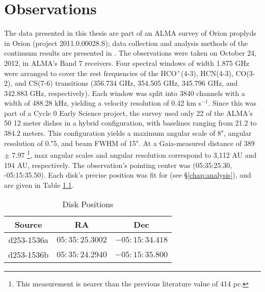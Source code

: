 \chapter{Observations}
\label{chap:observations}

 


The data presented in this thesis are part of an ALMA survey of Orion proplyds in Orion (project 2011.0.00028.S); data collection and analysis methods of the continuum results are presented in \citet{Mann2014}. The observations were taken on October 24, 2012, in ALMA's Band 7 receivers. Four spectral windows of width 1.875 GHz were arranged to cover the rest frequencies of the HCO$^+$(4-3), HCN(4-3), CO(3-2), and CS(7-6) transitions (356.734 GHz, 354.505 GHz, 345.796 GHz, and 342.883 GHz, respectively). Each window was split into 3840 channels with a width of 488.28 kHz, yielding a velocity resolution of 0.42 km s$^{-1}$. Since this was part of a Cycle 0 Early Science project, the survey used only 22 of the ALMA's 50 12 meter dishes in a hybrid configuration, with baselines ranging from 21.2 to 384.2 meters. This configuration yields a maximum angular scale of 8", angular resolution of 0."5, and beam FWHM of 15". At a Gaia-measured distance of 389 $\pm$ 7.97 \citep{GaiaCollaboration2018,GaiaCollaboration2018}\footnote{This measurement is nearer than the previous literature value of 414 pc.}, max angular scales and angular resolution correspond to 3,112 AU and 194 AU, respectively. The observation's pointing center was (05:35:25.30, -05:15:35.50). Each disk's precise position was fit for (see \S\ref{chap:analysis}), and are given in Table \ref{table:disk_positions}.


\begin{table}
  \centering
  \caption{Disk Positions}
  \label{table:disk_positions}
  \renewcommand{\arraystretch}{1.2}
  \begin{tabular}{c | c | c }
    \toprule \toprule
      Source      &  RA            & Dec \\
    \midrule %
      d253-1536a  &  $05:35:25.3002$ & $-05:15:34.418$  \\
      d253-1536b  &  $05:35:24.2940$ & $-05:15:35.800$  \\
    \bottomrule
  \end{tabular}
\end{table}

